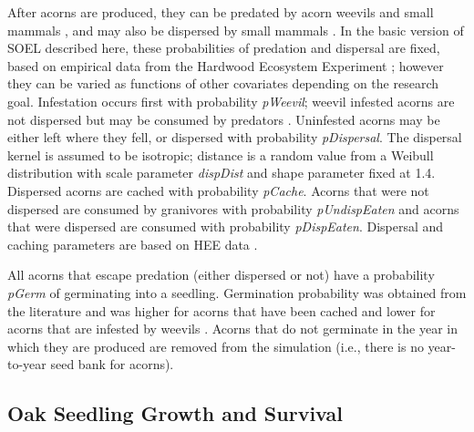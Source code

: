 \documentclass[
11pt, %
a4paper, %
oneside, %
headinclude,footinclude, %
]{scrartcl}
\begin{document}
After acorns are produced, they can be predated by acorn weevils \citep{Gibson1972a} and small mammals \citep{Bellocq2005, Kellner2014b}, and may also be dispersed by small mammals \citep{VanderWall2005, Moore2007a}. In the basic version of SOEL described here, these probabilities of predation and dispersal are fixed, based on empirical data from the Hardwood Ecosystem Experiment \citep{Kellner2014b,Kellner2016}; however they can be varied as functions of other covariates depending on the research goal. Infestation occurs first with probability \textit{pWeevil}; weevil infested acorns are not dispersed but may be consumed by predators \citep{Steele1996}. Uninfested acorns may be either left where they fell, or dispersed with probability \textit{pDispersal}. The dispersal kernel is assumed to be isotropic; distance is a random value from a Weibull distribution with scale parameter \textit{dispDist} and shape parameter fixed at 1.4. Dispersed acorns are cached with probability \textit{pCache}. Acorns that were not dispersed are consumed by granivores with probability \textit{pUndispEaten} and acorns that were dispersed are consumed with probability \textit{pDispEaten}.  Dispersal and caching parameters are based on HEE data \citep{Kellner2016}.

All acorns that escape predation (either dispersed or not) have a probability \textit{pGerm} of germinating into a seedling. Germination probability was obtained from the literature and was higher for acorns that have been cached and lower for acorns that are infested by weevils \citep{Haas2005, Lombardo2009}. Acorns that do not germinate in the year in which they are produced are removed from the simulation (i.e., there is no year-to-year seed bank for acorns).

\subsection{Oak Seedling Growth and Survival}
\end{document}
